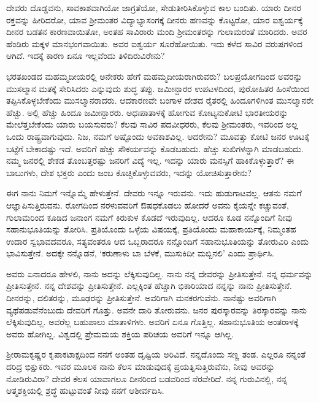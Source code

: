 ದೇವರು ದೊಡ್ಡವನು, ಸಾವಕಾಶವಾಗಿಯೋ ಜಾಗ್ರತೆಯೋ, ಸೇಡುತೀರಿಸಿಕೊಳ್ಳುವ ಕಾಲ ಬಂದಿತು. ಯಾರು ದೀನರ ರಕ್ತವನ್ನು ಹೀರಿದರೋ, ಯಾವ ಶ‍್ರೀಮಂತರ ವಿದ್ಯಾಭ್ಯಾಸಂಗಕ್ಕೆ ದೀನರು ಹಣವನ್ನು ಕೊಟ್ಟರೋ, ಯಾರ ಐಶ್ವರ್ಯಕ್ಕೆ ದೀನರ ಬಡತನ ಕಾರಣವಾಯಿತೋ, ಅಂತಹ ಸಾವಿರಾರು ಮಂದಿ ಶ‍್ರೀಮಂತರನ್ನು ಗುಲಾಮರಂತೆ ಮಾರಿದರು. ಅವರ ಹೆಂಡಿರು ಮಕ್ಕಳ ಮಾನಭಂಗವಾಯಿತು. ಅವರ ಐಶ್ವರ್ಯ ಸೂರೆಹೋಯಿತು. ಇದು ಕಳೆದ ಸಾವಿರ ವರುಷಗಳಿಂದ ಆಗಿದೆ. ಇದಕ್ಕೆ ಕಾರಣ ಏನೂ ಇಲ್ಲವೆಂದು ತಿಳಿದಿರುವಿರೇನು?

ಭರತಖಂಡದ ಮಹಮ್ಮದೀಯರಲ್ಲಿ ಅನೇಕರು ಹೇಗೆ ಮಹಮ್ಮದೀಯರಾಗಿರುವರು? ಬಲಪ್ರಯೋಗದಿಂದ ಅವರನ್ನು ಮುಸಲ್ಮಾನ ಮತಕ್ಕೆ ಸೇರಿಸಿದರು ಎನ್ನುವುದು ಶುದ್ಧ ತಪ್ಪು. ಜಮೀನ್ದಾರರ ಉಪಟಳದಿಂದ, ಪುರೋಹಿತರ ಹಿಂಸೆಯಿಂದ ತಪ್ಪಿಸಿಕೊಳ್ಳಬೇಕೆಂದು ಮುಸಲ್ಮಾನರಾದರು. ಆದಕಾರಣವೇ ಬಂಗಾಳ ದೇಶದ ರೈತರಲ್ಲಿ ಹಿಂದೂಗಳಿಗಿಂತ ಮುಸಲ್ಮಾನರೇ ಹೆಚ್ಚು. ಅಲ್ಲಿ ಹೆಚ್ಚು ಹಿಂದೂ ಜಮೀನ್ದಾರರು. ಅಧಃಪಾತಾಳಕ್ಕೆ ಹೋಗುವ ಕೋಟ್ಯನುಕೋಟಿ ಭಾರತೀಯರನ್ನು ಮೇಲೆತ್ತಬೇಕೆಂದು ಯಾರು ಬಯಸುವರು? ಕೆಲವು ಸಾವಿರ ಪದವೀಧರರು, ಕೆಲವು ಶ‍್ರೀಮಂತರು, ಇವರಿಂದ ಅಲ್ಲ ಒಂದು ರಾಷ್ಟ್ರವಾಗುವುದು. ನಿಜ, ನಮಗೆ ಅಷ್ಟೊಂದು ಅವಕಾಶವಿಲ್ಲ. ಆದರೇನು? ಮೂವತ್ತು ಕೋಟಿ ಜನರ ಊಟಕ್ಕೆ ಬಟ್ಟೆಗೆ ಬೇಕಾದಷ್ಟು ಇದೆ. ಅವರಿಗೆ ಹೆಚ್ಚು ಸೌಕರ್ಯವನ್ನು ಕೊಡಬಹುದು. ಹೆಚ್ಚು ಸುಖಿಗಳನ್ನಾಗಿ ಮಾಡಬಹುದು. ನಮ್ಮ ಜನರಲ್ಲಿ ಶೇಕಡ ತೊಂಬತ್ತರಷ್ಟು ಜನರಿಗೆ ವಿದ್ಯೆ ಇಲ್ಲ. ಇದನ್ನು ಯಾರು ಮನಸ್ಸಿಗೆ ಹಾಕಿಕೊಳ್ಳುತ್ತಾರೆ? ಈ ಬಾಬುಗಳು, ದೇಶ ಭಕ್ತರು ಎಂದು ಜಂಬ ಕೊಚ್ಚಿಕೊಳ್ಳುವವರು, ಇದನ್ನು ಯೋಚಿಸುತ್ತಾರೇನು?

ಈಗ ನಾನು ನಿಮಗೆ ಇನ್ನೊಮ್ಮೆ ಹೇಳುತ್ತೇನೆ. ದೇವರು ಇನ್ನೂ ಇರುವನು. ಇದು ಹುಡುಗಾಟವಲ್ಲ. ಆತನು ನಮಗೆ ಆಜ್ಞಾಪಿಸುತ್ತಿರುವನು. ರೋಗದಿಂದ ನರಳುವವರಿಗೆ ಔಷಧಕೊಡಲು ಹೋದರೆ ಅವನು ಕೈಯನ್ನೇ ಕಚ್ಚುವಂತೆ, ಗುಲಾಮರಿಂದ ಕೂಡಿದ ಜನಾಂಗ ನಮಗೆ ಕಿರುಕುಳ ಕೊಡದೆ ಇರುವುದಿಲ್ಲ. ಆದರೂ ಕೂಡ ನನ್ನೊಂದಿಗೆ ನೀವು ಸಹಾನುಭೂತಿಯನ್ನು ತೋರಿಸಿ. ಪ್ರತಿಯೊಂದು ಒಳ್ಳೆಯ ವಿಷಯಕ್ಕೆ, ಪ್ರತಿಯೊಂದು ಮಹಾಕಾರ್ಯಕ್ಕೆ, ನಿಮ್ಮಂತಹ ಉದಾರ ಸ್ವಭಾವದವರೂ, ಸತ್ಯವಂತರೂ ಆದ ಒಬ್ಬರಾದರೂ ನನ್ನೊಂದಿಗೆ ಸಹಾನುಭೂತಿಯನ್ನು ತೋರುವಿರಿ ಎಂದು ಭಾವಿಸುತ್ತೇನೆ. ಅದಕ್ಕೇ ನನ್ನೊಡನೆ, `ಕರುಣಾಳು ಬಾ ಬೆಳಕೆ, ಮುಸುಕಿದೀ ಮಬ್ಬಿನಲಿ' ಎಂದು ಪ್ರಾರ್ಥಿಸಿ.

ಅವರು ಏನಾದರೂ ಹೇಳಲಿ, ನಾನು ಅದನ್ನು ಲೆಕ್ಕಿಸುವುದಿಲ್ಲ. ನಾನು ನನ್ನ ದೇವರನ್ನು ಪ್ರೀತಿಸುತ್ತೇನೆ. ನನ್ನ ಧರ್ಮವನ್ನು ಪ್ರೀತಿಸುತ್ತೇನೆ. ನನ್ನ ದೇಶವನ್ನು ಪ್ರೀತಿಸುತ್ತೇನೆ. ಎಲ್ಲಕ್ಕಿಂತ ಹೆಚ್ಚಾಗಿ ಭಿಕಾರಿಯಾದ ನನ್ನನ್ನು ನಾನು ಪ್ರೀತಿಸುತ್ತೇನೆ. ದೀನರನ್ನು, ದಲಿತರನ್ನು, ಮೂಢರನ್ನು ಪ್ರೀತಿಸುತ್ತೇನೆ. ಅವರಿಗಾಗಿ ಮನಕರಗುವೆನು. ನಾನೆಷ್ಟು ಅವರಿಗಾಗಿ ವ್ಯಥೆಪಡುವೆನೆಂಬುದು ದೇವರಿಗೆ ಗೊತ್ತು. ಅವನೇ ದಾರಿ ತೋರುವನು. ಜನರ ಪುರಸ್ಕಾರವನ್ನು ತಿರಸ್ಕಾರವನ್ನು ನಾನು ಲೆಕ್ಕಿಸುವುದಿಲ್ಲ. ಅವರೆಲ್ಲ ಬಹುಪಾಲು ಮಾತಾಳಿಗಳು. ಅವರಿಗೆ ಏನೂ ಗೊತ್ತಿಲ್ಲ. ಸಹಾನುಭೂತಿಯ ಅಂತರಾಳಕ್ಕೆ ಅವರು ಹೋಗಿಲ್ಲ. ವಿಶ್ವದಲ್ಲಿ ಪ್ರೇಮಮಯ ಶಕ್ತಿಯ ಪರಿಚಯ ಅವರಿಗೆ ಇನ್ನೂ ಆಗಿಲ್ಲ.

ಶ‍್ರೀರಾಮಕೃಷ್ಣರ ಕೃಪಾಕಟಾಕ್ಷದಿಂದ ನನಗೆ ಅಂತಹ ದೃಷ್ಟಿಯ ಅರಿವಿದೆ. ನನ್ನದೊಂದು ಸಣ್ಣ ತಂಡ. ಎಲ್ಲರೂ ನನ್ನಂತೆ ದರಿದ್ರ ಭಿಕ್ಷುಕರು. ಇವರ ಮೂಲಕ ನಾನು ಕೆಲಸ ಮಾಡುವುದಕ್ಕೆ ಪ್ರಯತ್ನಿಸುತ್ತಿರುವೆನು, ನೀವು ಅವರನ್ನು ನೋಡಿರುವಿರಾ? ದೇವರ ಕೆಲಸ ಯಾವಾಗಲೂ ದೀನರಿಂದ ಬಡವರಿಂದ ನೆರವೇರಿದೆ. ನನ್ನ ಗುರುವಿನಲ್ಲಿ, ನನ್ನ ಆತ್ಮಶಕ್ತಿಯಲ್ಲಿ ಶ್ರದ್ಧೆ ಹುಟ್ಟುವಂತೆ ನೀವು ನನಗೆ ಆಶೀರ್ವದಿಸಿ.

